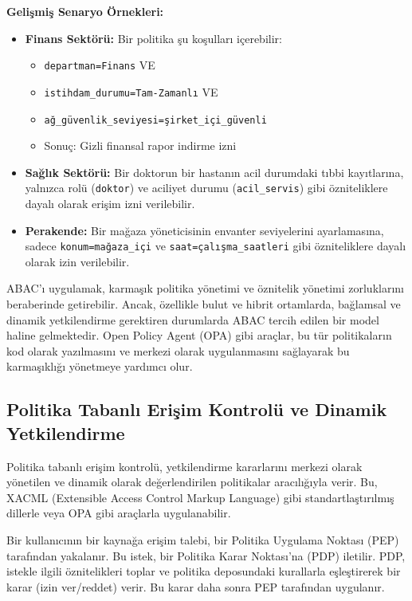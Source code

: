 \textbf{Gelişmiş Senaryo Örnekleri:}
\begin{itemize}
    \item \textbf{Finans Sektörü:} Bir politika şu koşulları içerebilir:
    \begin{itemize}
        \item \verb|departman=Finans| VE
        \item \verb|istihdam_durumu=Tam-Zamanlı| VE  
        \item \verb|ağ_güvenlik_seviyesi=şirket_içi_güvenli|
        \item Sonuç: Gizli finansal rapor indirme izni
    \end{itemize}
    \item \textbf{Sağlık Sektörü:} Bir doktorun bir hastanın acil durumdaki tıbbi kayıtlarına, yalnızca rolü (\verb|doktor|) ve aciliyet durumu (\verb|acil_servis|) gibi özniteliklere dayalı olarak erişim izni verilebilir.
    \item \textbf{Perakende:} Bir mağaza yöneticisinin envanter seviyelerini ayarlamasına, sadece \verb|konum=mağaza_içi| ve \verb|saat=çalışma_saatleri| gibi özniteliklere dayalı olarak izin verilebilir.
\end{itemize}

ABAC'ı uygulamak, karmaşık politika yönetimi ve öznitelik yönetimi zorluklarını beraberinde getirebilir. Ancak, özellikle bulut ve hibrit ortamlarda, bağlamsal ve dinamik yetkilendirme gerektiren durumlarda ABAC tercih edilen bir model haline gelmektedir. Open Policy Agent (OPA) gibi araçlar, bu tür politikaların kod olarak yazılmasını ve merkezi olarak uygulanmasını sağlayarak bu karmaşıklığı yönetmeye yardımcı olur.

\subsection{Politika Tabanlı Erişim Kontrolü ve Dinamik Yetkilendirme}

Politika tabanlı erişim kontrolü, yetkilendirme kararlarını merkezi olarak yönetilen ve dinamik olarak değerlendirilen politikalar aracılığıyla verir. Bu, XACML (Extensible Access Control Markup Language) gibi standartlaştırılmış dillerle veya OPA gibi araçlarla uygulanabilir.

Bir kullanıcının bir kaynağa erişim talebi, bir Politika Uygulama Noktası (PEP) tarafından yakalanır. Bu istek, bir Politika Karar Noktası'na (PDP) iletilir. PDP, istekle ilgili öznitelikleri toplar ve politika deposundaki kurallarla eşleştirerek bir karar (izin ver/reddet) verir. Bu karar daha sonra PEP tarafından uygulanır.

